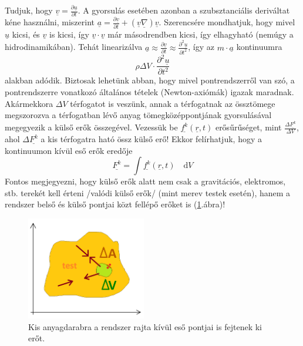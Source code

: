 \documentclass[a4paper, 12pt, titlepage]{article}
\begin{document}
\newline
Tudjuk, hogy $\underline{v}=\frac{\partial \underline{u}}{\partial t}$. A gyorsulás esetében azonban a szubsztanciális deriváltat kéne használni, miszerint $\underline{a}=\frac{\partial \underline{v}}{\partial t}+(\underline{v} \underline{\nabla})\underline{v}$. Szerencsére mondhatjuk, hogy mivel $\underline{u}$ kicsi, és $\underline{v}$ is kicsi, így $\underline{v}\cdot\underline{v}$ már másodrendben kicsi, így elhagyható (nemúgy a hidrodinamikában). Tehát linearizálva $\underline{a}\approx\frac{\partial \underline{v}}{\partial t}\approx\frac{\partial^{2} \underline{u}}{\partial t^{2}}$, így az $m\cdot\underline{a}$ kontinuumra
	\begin{equation}
\rho\Delta V\cdot\frac{\partial^{2} \underline{u}}{\partial t^{2}}
	\label{eq:ma}
	\end{equation}
alakban adódik. %
\newline
\newline
Biztosak lehetünk abban, hogy mivel pontrendszerről van szó, a pontrendszerre vonatkozó általános tételek (Newton-axiómák) igazak maradnak. Akármekkora $\Delta V$ térfogatot is veszünk, annak a térfogatnak az össztömege megszorozva a térfogatban lévő anyag tömegközéppontjának gyorsulásával megegyezik a külső erők összegével.
\newline
Vezessük be $\underline{f^{k}}(\underline{r},t)$ erősűrűséget, mint $\frac{\Delta\underline{F^{k}}}{\Delta V}$, ahol $\Delta\underline{F^{k}}$ a kis térfogatra ható össz külső erő! Ekkor felírhatjuk, hogy a kontinuumon kívül eső erők eredője 
\[\underline{F^{k}}=\int\underline{f^{k}}(\underline{r},t)\quad\mathrm{d}V\] %
\newline
Fontos megjegyezni, hogy külső erők alatt nem csak a gravitációs, elektromos, stb. terekét kell érteni /valódi külső erők/ (mint merev testek esetén), hanem a rendszer belső és külső pontjai közt fellépő erőket is (\ref{fig:belsof}.\hspace{1mm}ábra)!
	\begin{figure}[!h]
	\includegraphics[height=4.5cm]{./belsof.png} %
	\centering
	\caption{Kis anyagdarabra a rendszer rajta kívül eső pontjai is fejtenek ki erőt.}
	\label{fig:belsof}
	\end{figure}
\end{document}
